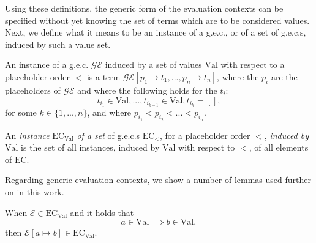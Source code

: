 Using these definitions, the generic form of the evaluation contexts can be specified without yet knowing the set of terms which are to be considered values. Next, we define what it means to be an instance of a g.e.c., or of a set of g.e.c.s, induced by such a value set.

\begin{definition}[Instance of a g.e.c.]
An instance of a g.e.c. $\mathcal{GE}$ induced by a set of values $\textrm{Val}$ with respect to  a placeholder order $<$ is a term $\mathcal{GE}[p_1 \mapsto t_1, ..., p_n \mapsto t_n]$, where the $p_i$ are the placeholders of $\mathcal{GE}$ and where the following holds for the $t_i$:
\[
t_{i_1} \in \textrm{Val}, ..., t_{i_{k-1}} \in \textrm{Val}, t_{i_k} = [],
\]
for some $k \in \{1, ..., n\}$, and where $p_{i_1} < p_{i_2} < ... < p_{i_n}$.
\end{definition}

\begin{definition}
An \textit{instance} $\textrm{EC}_{\textrm{Val}}$ \textit{of a set} of g.e.c.s $\textrm{EC}_<$, for a placeholder order $<$, \textit{induced by $\textrm{Val}$} is the set of all instances, induced by $\textrm{Val}$ with respect to $<$, of all elements of $\textrm{EC}$.
\end{definition}

Regarding generic evaluation contexts, we show a number of lemmas used further on in this work.

\begin{lemma}
When $\mathcal{E} \in \textrm{EC}_{\textrm{Val}}$ and it holds that
\[
a \in \textrm{Val} \implies b \in \textrm{Val},
\]
then $\mathcal{E}[a \mapsto b] \in \textrm{EC}_{\textrm{Val}}$.
\end{lemma}

